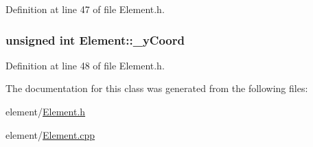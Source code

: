 Definition at line 47 of file Element.\-h.

\hypertarget{class_element_ab7215197a138c164d0ab07d7632e2ef2}{
\subsubsection[{\-\_\-y\-Coord}]{\setlength{\rightskip}{0pt plus 5cm}unsigned int Element\-::\-\_\-y\-Coord\hspace{0.3cm}{\ttfamily [protected]}}}\label{class_element_ab7215197a138c164d0ab07d7632e2ef2}


Definition at line 48 of file Element.\-h.



The documentation for this class was generated from the following files\-:\begin{DoxyCompactItemize}
\item 
element/\hyperlink{_element_8h}{Element.\-h}\item 
element/\hyperlink{_element_8cpp}{Element.\-cpp}\end{DoxyCompactItemize}
